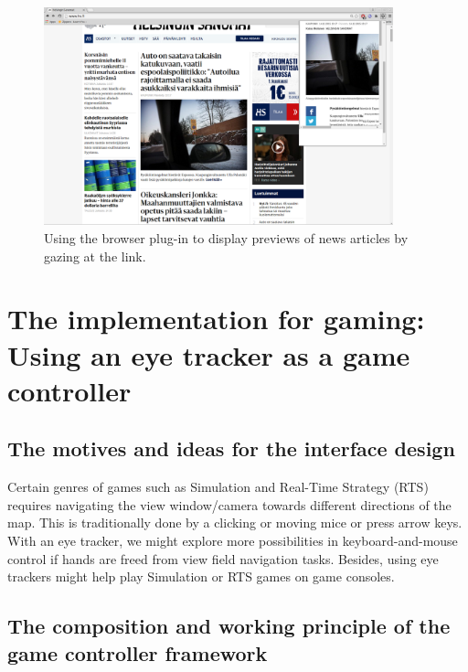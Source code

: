 \documentclass[english]{tktltiki}
\begin{document}
\begin{figure}[h]
\begin{center}
\includegraphics[width=0.9\textwidth]{browser_plugin.png}
\caption{Using the browser plug-in to display previews of news articles by gazing at the link.}
\label{pluginusage}
\end{center}
\end{figure}



\section{The implementation for gaming: Using an eye tracker as a game controller}


\subsection{The motives and ideas for the interface design}

Certain genres of games such as Simulation and Real-Time Strategy (RTS) requires navigating the view window/camera towards different directions of the map. This is traditionally done by a clicking or moving mice or press arrow keys. With an eye tracker, we might explore more possibilities in keyboard-and-mouse control if hands are freed from view field navigation tasks. Besides, using eye trackers might help play Simulation or RTS games on game consoles.


\subsection{The composition and working principle of the game controller framework}
\end{document}
